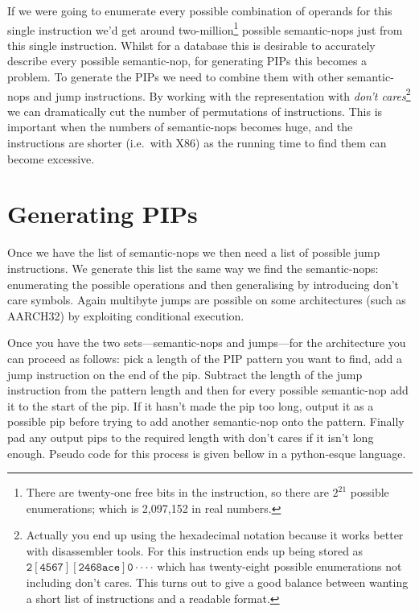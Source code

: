 \documentclass[]{book}
\begin{document}
If we were going to enumerate every possible combination of operands for
this single instruction we'd get around two-million\footnote{There are
  twenty-one free bits in the instruction, so there are $2^{21}$
  possible enumerations; which is 2,097,152 in real numbers.} possible
semantic-nops just from this single instruction. Whilst for a database
this is desirable to accurately describe every possible semantic-nop,
for generating PIPs this becomes a problem. To generate the PIPs we need
to combine them with other semantic-nops and jump instructions. By
working with the representation with \emph{don't cares}\footnote{Actually
  you end up using the hexadecimal notation because it works better with
  disassembler tools. For this instruction ends up being stored as
  $\mathtt{2[4567][2468ace]0\cdot\cdot\cdot\cdot}$ which has
  twenty-eight possible enumerations not including don't cares. This
  turns out to give a good balance between wanting a short list of
  instructions and a readable format.} we can dramatically cut the
number of permutations of instructions. This is important when the
numbers of semantic-nops becomes huge, and the instructions are shorter
(i.e.~with X86) as the running time to find them can become excessive.

\section{Generating PIPs}

Once we have the list of semantic-nops we then need a list of possible
jump instructions. We generate this list the same way we find the
semantic-nops: enumerating the possible operations and then generalising
by introducing don't care symbols. Again multibyte jumps are possible on
some architectures (such as AARCH32) by exploiting conditional
execution.

Once you have the two sets---semantic-nops and jumps---for the
architecture you can proceed as follows: pick a length of the PIP
pattern you want to find, add a jump instruction on the end of the pip.
Subtract the length of the jump instruction from the pattern length and
then for every possible semantic-nop add it to the start of the pip. If
it hasn't made the pip too long, output it as a possible pip before
trying to add another semantic-nop onto the pattern. Finally pad any
output pips to the required length with don't cares if it isn't long
enough. Pseudo code for this process is given bellow in a python-esque
language.
\end{document}
